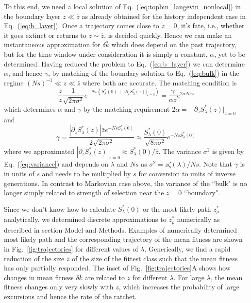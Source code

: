 \documentclass[rmp,preprint]{revtex4}
\newcommand{\EQ}[1]{Eq.~(\ref{eq:#1})}
\newcommand{\FIG}[1]{Fig.~\ref{fig:#1}}
\newcommand{\xz}{z}
\newcommand{\xzs}{\bar{\xz}}
\newcommand{\rate}{\gamma}
\newcommand{\dk}{\delta \bar{k}}
\newcommand{\tx}[1]{\xz_{#1}}
\newcommand{\Smin}{S^*}
\begin{document}
To this end, we need a local solution of \EQ{topbin_langevin_nonlocal} in the boundary layer $\xz\ll \xzs$ as already obtained for the history independent case in \EQ{b_layer}. Once a trajectory comes close to $\xz=0$, it's fate, i.e., whether it goes extinct or returns to $\xz\sim \xzs$, is decided quickly. Hence we can make an instantaneous approximation for $\dk$ which does depend on the past trajectory, but for the time window under consideration it is simply a constant, $\alpha$, yet to be determined. Having reduced the problem to \EQ{b_layer} we can determine  $\alpha$, and hence $\rate$,  by matching of the boundary solution to \EQ{bulk} in the regime $(Ns)^{-1} \ll \xz \ll \xzs$ where both are accurate. The matching condition is
\begin{equation}
\frac{\xzs}{\xz}\frac{1}{\sqrt{2\pi \sigma^2}}e^{-Ns (\Smin_{\lambda}(0)+\xz\partial_\xz \Smin_{\lambda}(\xz)|_{\xz=0})} = \frac{\rate}{\alpha \xz}e^{2\alpha Ns \xz }
\end{equation}
which determines $\alpha$ and $\rate$ by the matching requirement $2\alpha = -\partial_\xz \Smin_{\lambda}(\xz)|_{\xz=0}$ and
\begin{equation}
\label{eq:rate}
\rate=  \frac{|\partial_\xz \Smin_{\lambda}(\xz)|\xzs e^{-Ns \Smin_{\lambda}(0)}}{2\sqrt{2\pi \sigma^2}} \approx
\frac{\Smin_{\lambda}(0)}{\sqrt{8\pi\sigma^2}}e^{-Ns\Smin_{\lambda}(0)}
\end{equation}
where we approximated $|\partial_\xz \Smin_{\lambda}(\xz)|_{\xz=0} \approx \Smin_{\lambda}(0)/\xzs$. The variance $\sigma^2$ is given by \EQ{variance} and depends on $\lambda$ and $Ns$ as $\sigma^2 = \xzs \zeta(\lambda)/Ns$. Note that $\rate$ is in units of $s$ and needs to be multiplied by $s$ for conversion to units of inverse generations.  In contrast to Markovian case above, the variance of the ``bulk" is no longer simply related to strength of selection near the $\xz=0$ ``boundary".

Since we don't know how to calculate $\Smin_{\lambda}(0)$ or the most likely path $\tx{\rho}^*$ analytically, we determined discrete approximations to $\tx{\rho}^*$ numerically as described in section Model and Methods. Examples of numerically determined most likely path and the corresponding trajectory of the mean fitness are shown in \FIG{trajectories} for different values of $\lambda$. Generically, we find a rapid reduction of the size $\xzs$ of the size of the fittest class such that the mean fitness has only partially responded. The inset of \FIG{trajectories}A shows how changes in mean fitness $\dk$ are related to $\xz$ for different $\lambda$. For large $\lambda$, the mean fitness changes only very slowly with $\xz$, which increases the probability of large excursions and hence the rate of the ratchet.
\end{document}
